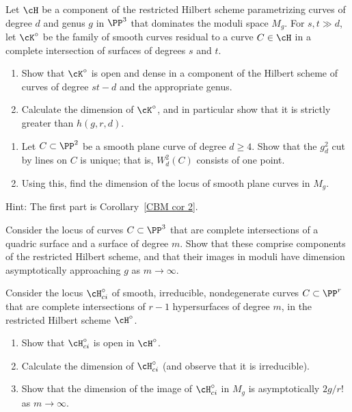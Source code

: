 \begin{exercise}\label{many large components}
Let $\cH$ be a component of the restricted Hilbert scheme param\-etrizing
curves of degree $d$ and genus $g$ in $\PP^3$ that dominates the moduli
space $M_g$. For $s, t \gg d$, let $\cK^\circ$ be the family of smooth
curves residual to a curve $C \in  \cH$ in a complete intersection of
surfaces of degrees $s$ and $t$.
\begin{enumerate}
\item Show that $\cK^\circ$ is open and dense in a component of the
Hilbert scheme of curves of degree $st-d$ and the appropriate genus.
\item Calculate the dimension of $\cK^\circ$, and in particular show
that it is strictly greater than $h(g,r,d)$.
\end{enumerate}
\end{exercise}

\begin{exercise}\label{moduli of plane curves}
\begin{enumerate}
\item Let $C \subset \PP^2$ be a smooth plane curve of degree $d\geq
4$. Show that the $g^2_d$ cut by lines on $C$ is unique; that is,
$W^2_d(C)$ consists of one point.
\item Using this, find the dimension of the locus of smooth plane curves
in $M_g$.
\end{enumerate}

Hint: The first part is Corollary~\ref{CBM cor 2}.
\end{exercise}

\begin{exercise}\label{balanced ci}
Consider the locus of curves $C \subset \PP^3$ that are complete
intersections of a quadric surface and a surface of degree $m$. Show
that these comprise components of the restricted Hilbert scheme, and
that their images in moduli have dimension asymptotically approaching $g$
as $m \to \infty$.
\end{exercise}

\begin{exercise}\label{balanced CI in higher codim}
Consider the locus $\cH^\circ_{ci}$ of smooth, irreducible, nondegenerate
curves $C \subset \PP^r$ that are complete intersections of $r-1$
hypersurfaces of degree $m$, in the restricted Hilbert scheme $\cH^\circ$.
\begin{enumerate}
\item Show that $\cH^\circ_{ci}$ is open in $\cH^\circ$.
\item Calculate the dimension of $\cH^\circ_{ci}$ (and observe that it
is irreducible).
\item Show that the dimension of the image of $\cH^\circ_{ci}$ in $M_g$
is asymptotically $2g/r!$ as $m \to \infty$.
%
\end{enumerate}
\end{exercise}



